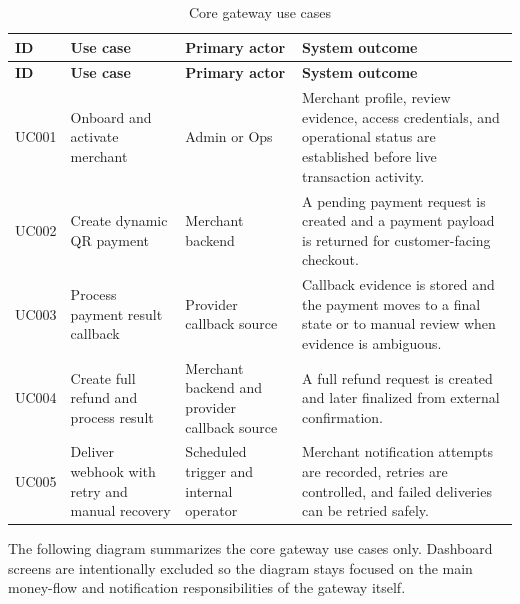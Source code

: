 \begin{longtable}{L{0.11\textwidth}L{0.25\textwidth}L{0.18\textwidth}L{0.34\textwidth}}
\caption{Core gateway use cases}\\
\toprule
\textbf{ID} & \textbf{Use case} & \textbf{Primary actor} & \textbf{System outcome} \\
\midrule
\endfirsthead
\toprule
\textbf{ID} & \textbf{Use case} & \textbf{Primary actor} & \textbf{System outcome} \\
\midrule
\endhead
UC001 & Onboard and activate merchant & Admin or Ops & Merchant profile, review evidence, access credentials, and operational status are established before live transaction activity. \\
\bodyrowrule
UC002 & Create dynamic QR payment & Merchant backend & A pending payment request is created and a payment payload is returned for customer-facing checkout. \\
\bodyrowrule
UC003 & Process payment result callback & Provider callback source & Callback evidence is stored and the payment moves to a final state or to manual review when evidence is ambiguous. \\
\bodyrowrule
UC004 & Create full refund and process result & Merchant backend and provider callback source & A full refund request is created and later finalized from external confirmation. \\
\bodyrowrule
UC005 & Deliver webhook with retry and manual recovery & Scheduled trigger and internal operator & Merchant notification attempts are recorded, retries are controlled, and failed deliveries can be retried safely. \\
\bottomrule
\end{longtable}

The following diagram summarizes the core gateway use cases only. Dashboard
screens are intentionally excluded so the diagram stays focused on the main
money-flow and notification responsibilities of the gateway itself.

